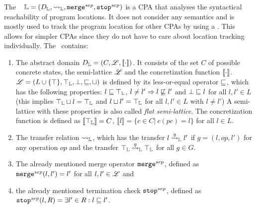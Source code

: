 \subsubsection{\LocationCPA}
The \locationCPA\ \cite{BeyerBook} $\mathbb{L} = (D_{\mathbb{L}}, \rightsquigarrow_{\mathbb{L}}, \texttt{merge}^{sep}, \texttt{stop}^{sep})$ is a CPA that analyses the syntactical reachability of program locations.
It does not consider any semantics and is mostly used to track the program location for other CPAs by using a \compositeCPA.
This allows for simpler CPAs since they do not have to care about location tracking individually.
The \locationCPA\ contains:
\begin{enumerate}[leftmargin=*, label=\arabic*.]
\item The abstract domain $D_{\mathbb{L}} = (C, \mathscr{L}, [\![ \cdot ]\!])$. It consists of the set  $C$ of possible concrete states, the semi-lattice $\mathscr{L}$ and the concretization function $[\![ \cdot ]\!]$.
	$\mathscr{L} = (L \cup \{\top\}, \top_{\mathbb{L}}, \bot, \sqsubseteq, \sqcup)$ is defined by its less-or-equal operator $\sqsubseteq$, which has the following properties:
	$l \sqsubseteq \top_{\mathbb{L}}$, $l \neq l' \Rightarrow l \not\sqsubseteq l'$ and $\bot \sqsubseteq l$ for all $l, l' \in L$
	(this implies $\top_{\mathbb{L}} \sqcup l = \top_{\mathbb{L}}$ and $l \sqcup l' = \top_{\mathbb{L}}$ for all $l, l' \in L$ with $l \neq l'$) A semi-lattice with 	these properties is also called \emph{flat semi-lattice}.
	The concretization function is defined as $[\![ \top_{\mathbb{L}} ]\!] = C$, $\llbracket l \rrbracket = \{ c \in C |\ c(pc) = l\}$ for all $l \in L$.
\item The transfer relation $\rightsquigarrow_{\mathbb{L}}$, which has the transfer $l \overset{g}{\rightsquigarrow}_{\mathbb{L}} l'$ if $g = (l, op, l')$ for any operation $op$
	and the transfer $\top_{\mathbb{L}} \overset{g}{\rightsquigarrow}_{\mathbb{L}} \top_{\mathbb{L}}$ for all $g \in G$.
\item The already mentioned merge operator $\texttt{merge}^{sep}$, defined as $\texttt{merge}^{sep}(l, l') = l'$ for all $l, l' \in \mathscr{L}$ and
\item the already mentioned termination check $\texttt{stop}^{sep}$, defined as $\texttt{stop}^{sep}(l, R) = \exists l' \in R : l \sqsubseteq l'$.
\end{enumerate}


